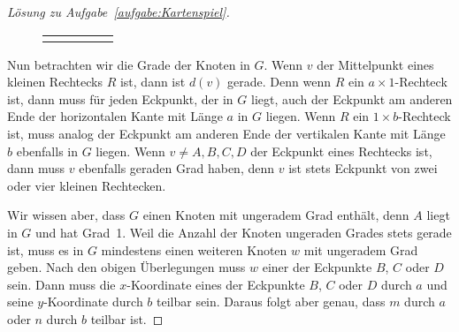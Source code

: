 \begin{proof}[Lösung zu Aufgabe~\ref{aufgabe:Kartenspiel}]
\begin{figure}[ht]
\begin{tabularx}{\textwidth}{X c X c X}
\begin{tikzpicture}[x=0.65cm,y=0.65cm]
			\end{tikzpicture} &
		\end{tabularx}
	\end{figure}	
	Nun betrachten wir die Grade der Knoten in $G$. Wenn $v$ der Mittelpunkt eines kleinen Rechtecks $R$ ist, dann ist $d(v)$ gerade. Denn wenn $R$ ein $a\times 1$-Rechteck ist, dann muss für jeden Eckpunkt, der in $G$ liegt, auch der Eckpunkt am anderen Ende der horizontalen Kante mit Länge $a$ in $G$ liegen. Wenn $R$ ein $1\times b$-Rechteck ist, muss analog der Eckpunkt am anderen Ende der vertikalen Kante mit Länge $b$ ebenfalls in $G$ liegen. Wenn $v\neq A,B,C,D$ der Eckpunkt eines Rechtecks ist, dann muss $v$ ebenfalls geraden Grad haben, denn $v$ ist stets Eckpunkt von zwei oder vier kleinen Rechtecken.
	
	Wir wissen aber, dass $G$ einen Knoten mit ungeradem Grad enthält, denn $A$ liegt in $G$ und hat Grad~1. Weil die Anzahl der Knoten ungeraden Grades stets gerade ist, muss es in $G$ mindestens einen weiteren Knoten $w$ mit ungeradem Grad geben. Nach den obigen Überlegungen muss $w$ einer der Eckpunkte $B$, $C$ oder $D$ sein. Dann muss die $x$-Koordinate eines der Eckpunkte $B$, $C$ oder $D$ durch $a$ und seine $y$-Koordinate durch $b$ teilbar sein. Daraus folgt aber genau, dass $m$ durch $a$ oder $n$ durch $b$ teilbar ist.
\end{proof}
